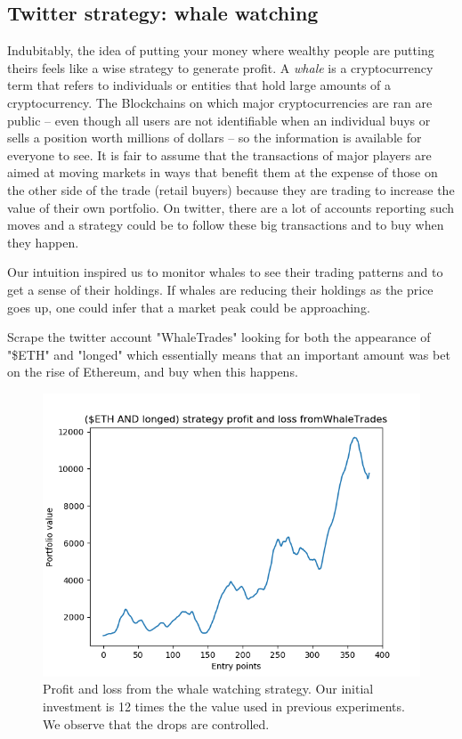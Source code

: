 \documentclass[twoside]{report}
\begin{document}
\begin{spacing}{1}
\subsection{Twitter strategy: whale watching}
Indubitably, the idea of putting your money where wealthy people are putting theirs feels like a wise strategy to generate profit. A \textit{whale} is a cryptocurrency term that refers to individuals or entities that hold large amounts of a cryptocurrency. The Blockchains on which major cryptocurrencies are ran are public -- even though all users are not identifiable when an individual buys or sells a position worth millions of dollars -- so the information is available for everyone to see. It is fair to assume that the transactions of major players are aimed at moving markets in ways that benefit them at the expense of those on the other side of the trade (retail buyers) because they are trading to increase the value of their own portfolio. On twitter, there are a lot of accounts reporting such moves and a strategy could be to follow these big transactions and to buy when they happen.

Our intuition inspired us to monitor whales to see their trading patterns and to get a sense of their holdings. If whales are reducing their holdings as the price goes up, one could infer that a market peak could be approaching.
\begin{strategy}
Scrape the twitter account "WhaleTrades" looking for both the appearance of "\$ETH" and "longed" which essentially means that an important amount was bet on the rise of Ethereum, and buy when this happens. 
\end{strategy}\label{strat:sent} 

\begin{figure}[!htbp]
    \centering
    \includegraphics[scale = 0.5]{twitter_scraping/ETH-whales.png}
    \caption{Profit and loss from the whale watching strategy. Our initial investment is 12 times the the value used in previous experiments. We observe that the drops are controlled.}
    \label{fig: wwPnL}
\end{figure}


\end{spacing}
\end{document}
